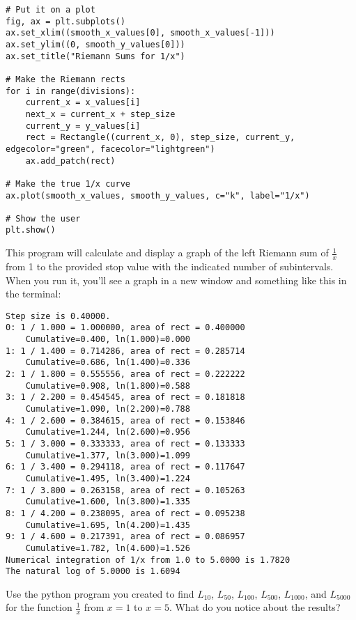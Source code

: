 \begin{Verbatim}
# Put it on a plot
fig, ax = plt.subplots()
ax.set_xlim((smooth_x_values[0], smooth_x_values[-1]))
ax.set_ylim((0, smooth_y_values[0]))
ax.set_title("Riemann Sums for 1/x")

# Make the Riemann rects
for i in range(divisions):
    current_x = x_values[i]
    next_x = current_x + step_size
    current_y = y_values[i]
    rect = Rectangle((current_x, 0), step_size, current_y, edgecolor="green", facecolor="lightgreen")
    ax.add_patch(rect)

# Make the true 1/x curve
ax.plot(smooth_x_values, smooth_y_values, c="k", label="1/x")

# Show the user
plt.show()

\end{Verbatim}

This program will calculate and display a graph of the left Riemann sum of $\frac{1}{x}$ from 1 to the provided stop value with the indicated number of subintervals. When you run it, you'll see a graph in a new window and something like this in the terminal:
\begin{Verbatim}
Step size is 0.40000.
0: 1 / 1.000 = 1.000000, area of rect = 0.400000 
	Cumulative=0.400, ln(1.000)=0.000
1: 1 / 1.400 = 0.714286, area of rect = 0.285714 
	Cumulative=0.686, ln(1.400)=0.336
2: 1 / 1.800 = 0.555556, area of rect = 0.222222 
	Cumulative=0.908, ln(1.800)=0.588
3: 1 / 2.200 = 0.454545, area of rect = 0.181818 
	Cumulative=1.090, ln(2.200)=0.788
4: 1 / 2.600 = 0.384615, area of rect = 0.153846 
	Cumulative=1.244, ln(2.600)=0.956
5: 1 / 3.000 = 0.333333, area of rect = 0.133333 
	Cumulative=1.377, ln(3.000)=1.099
6: 1 / 3.400 = 0.294118, area of rect = 0.117647 
	Cumulative=1.495, ln(3.400)=1.224
7: 1 / 3.800 = 0.263158, area of rect = 0.105263 
	Cumulative=1.600, ln(3.800)=1.335
8: 1 / 4.200 = 0.238095, area of rect = 0.095238 
	Cumulative=1.695, ln(4.200)=1.435
9: 1 / 4.600 = 0.217391, area of rect = 0.086957 
	Cumulative=1.782, ln(4.600)=1.526
Numerical integration of 1/x from 1.0 to 5.0000 is 1.7820
The natural log of 5.0000 is 1.6094
\end{Verbatim}

\begin{Exercise}[label=rsumpython]
Use the python program you created to find $L_{10}$, $L_{50}$, $L_{100}$, $L_{500}$, $L_{1000}$, and $L_{5000}$ for the function $\frac{1}{x}$ from $x=1$ to $x=5$. What do you notice about the results?
\end{Exercise}

